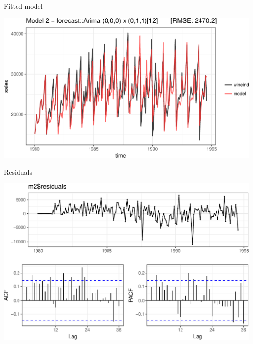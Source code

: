 \documentclass[11pt,ignorenonframetext,]{beamer}
\begin{document}
\begin{frame}{%
\protect\hypertarget{fitted-model-2}{%
Fitted model}}

\begin{center}\includegraphics[width=\textwidth]{Lec11_files/figure-beamer/unnamed-chunk-10-1} \end{center}

\end{frame}

\begin{frame}{%
\protect\hypertarget{residuals}{%
Residuals}}

\begin{center}\includegraphics[width=\textwidth]{Lec11_files/figure-beamer/unnamed-chunk-11-1} \end{center}

\end{frame}
\end{document}

